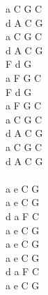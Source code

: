 \documentclass[a5paper, 10pt]{book}
\begin{document}
\begin{minipage}[t]{0.3\textwidth}
a C G C\\
d A C G\\
a C G C\\
d A C G\\

F d G \\
a F G C\\
F d G \\
a F G C\\

a C G C\\
d A C G\\
a C G C\\
d A C G\\

~\\

a e C G\\
a e C G\\
d a F C\\
a e C G\\

a e C G\\
a e C G\\
d a F C\\
a e C G\\
\end{minipage}

\newpage
\end{document}
